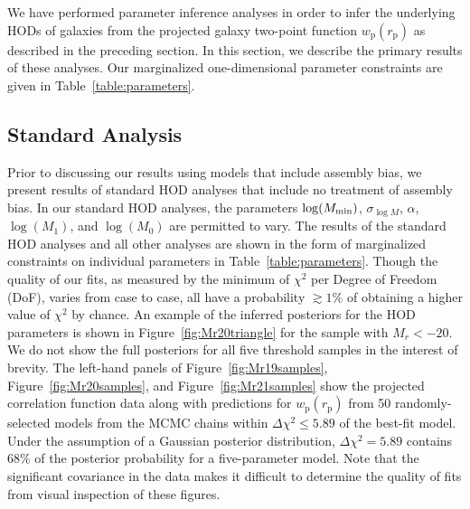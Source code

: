 \documentclass[usenatbib,usegraphicx,letterpaper]{mn2e}
\newcommand{\wprp}{w_{\mathrm{p}}}
\newcommand{\rp}{r_{\mathrm{p}}}
\newcommand{\magr}{M_r}
\begin{document}
We have performed parameter inference analyses in order to infer the underlying HODs of
galaxies from the projected galaxy two-point function $\wprp(\rp)$ as described in the preceding
section. In this section, we describe the primary results of these analyses. Our marginalized
one-dimensional parameter constraints are given in Table~\ref{table:parameters}.

\subsection{Standard Analysis}
\label{subsection:standard}

Prior to discussing our results using models that include assembly bias, we present
results of standard HOD analyses that include no treatment of assembly bias. 
In our standard HOD analyses, the parameters $\log (M_{\rm min})$,
$\sigma_{\log M}$, $\alpha$, $\log (M_1)$, and $\log (M_0)$ are permitted to vary. 
The results of the standard HOD analyses and all other analyses are shown in the form of 
marginalized constraints on individual parameters in Table~\ref{table:parameters}. Though the quality of 
our fits, as measured by the minimum of $\chi^2$ per Degree of Freedom (DoF), varies from case to case, 
all have a probability $\gtrsim 1\% $ of obtaining a higher value of $\chi^2$ by chance. 
An example of the inferred posteriors for the HOD parameters is shown in 
Figure~\ref{fig:Mr20triangle} for the sample with $\magr < -20$. We do 
not show the full posteriors for all five threshold samples in the interest of brevity.
The left-hand panels of Figure~\ref{fig:Mr19samples}, Figure~\ref{fig:Mr20samples}, and Figure~\ref{fig:Mr21samples}
show the projected correlation function data along with predictions for $\wprp(\rp)$ from 50 randomly-selected
models from the MCMC chains within $\Delta \chi^2 \le 5.89$ of the best-fit model. Under the assumption of 
a Gaussian posterior distribution, $\Delta \chi^2 = 5.89$ contains 68\% of the posterior probability for a 
five-parameter model. Note that the significant covariance in the data makes it difficult to
determine the quality of fits from visual inspection of these figures.
\end{document}
